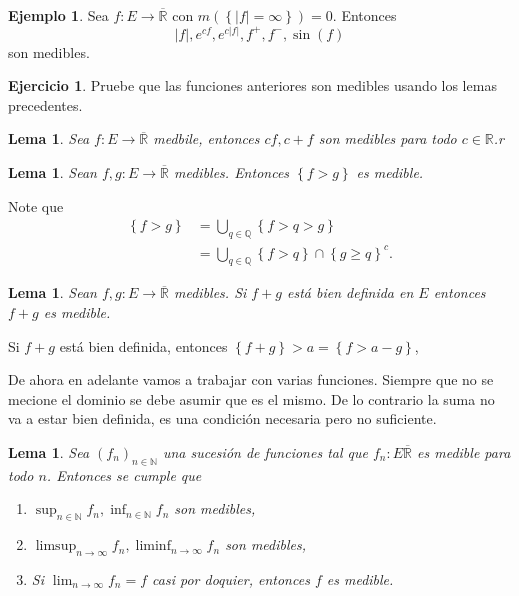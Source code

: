 \documentclass[12pt]{article}
\theoremstyle{plain}
\newtheorem{Lem}[Th]{Lema}             %
\theoremstyle{definition}
\newtheorem{Ex}[Th]{Ejemplo}               %
\newtheorem{Ej}[Th]{Ejercicio}
\theoremstyle{remark}
\numberwithin{equation}{section}
\newcommand{\bN}{\mathbb{N}}        %
\newcommand{\bQ}{\mathbb{Q}}        %
\newcommand{\bR}{\mathbb{R}}        %
\renewcommand{\geq}{\geqslant}      %
\renewcommand{\:}{\colon}           %
\newcommand{\conj}[1]{\left\lbrace#1\right\rbrace}
\begin{document}
\begin{multicols}{2}
\begin{Ex}
  Sea $f\: E\to\overline{\bR}$ con $m(\conj{|f|=\infty})=0$. Entonces
  $$|f|, e^{cf}, e^{c|f|},f^+,f^-, \sin(f)$$
  son medibles.
\end{Ex}

\begin{Ej}
  Pruebe que las funciones anteriores son medibles usando los lemas precedentes.
\end{Ej}

\begin{Lem}
   Sea $f\: E\to\overline{\bR}$ medbile, entonces $cf, c+f$ son medibles para todo $c\in\bR$.r
\end{Lem}

\begin{Lem}
  Sean $f,g\: E\to\overline{\bR}$ medibles. Entonces $\conj{f>g}$ es medible.
\end{Lem}

\begin{ptcbp}
Note que
\begin{align*}
  \conj{f>g} &=\bigcup_{q\in\bQ}\conj{f>q>g} \\
   &=\bigcup_{q\in\bQ} \conj{f>q}\cap\conj{g\geq q}^c.
\end{align*}
\end{ptcbp}

\begin{Lem}
  Sean $f,g\: E\to\overline{\bR}$ medibles. Si $f+g$ está bien definida en $E$ entonces $f+g$ es medible.
\end{Lem}

\begin{ptcbp}
Si $f+g$ está bien definida, entonces $\conj{f+g}>a=\conj{f>a-g}$,
\end{ptcbp}

De ahora en adelante vamos a trabajar con varias funciones. Siempre que no se mecione el dominio se debe asumir que es el mismo. De lo contrario la suma no va a estar bien definida, es una condición necesaria pero no suficiente.

\begin{Lem}
  Sea $(f_n)_{n\in\bN}$ una sucesión de funciones tal que $f_n\: E\overline{\bR}$ es medible para todo $n$. Entonces se cumple que
  \begin{enumerate}
    \item $\sup_{n\in\bN}f_n, \inf_{n\in\bN}f_n$ son medibles,
    \item $\limsup_{n\to\infty}f_n, \liminf_{n\to\infty}f_n$ son medibles,
    \item Si $\lim_{n\to\infty}f_n=f$ casi por doquier, entonces $f$ es medible.
  \end{enumerate}
\end{Lem}


\end{multicols}
\end{document}
